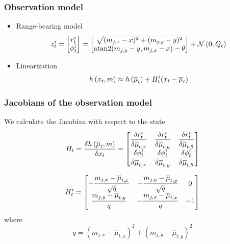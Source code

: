 \begin{frame}
    \frametitle{Observation model}
    \begin{itemize}
    \item Range-bearing model
    \begin{equation*}
    z_{t}^{i} =
    \begin{bmatrix}
    r_{t}^{i}\\
    \phi_{t}^{i}
    \end{bmatrix} =
    \begin{bmatrix}
    \sqrt{(m_{j,x}-x)^{2} + (m_{j,y}-y)^{2}}\\
    \operatorname{atan2}(m_{j,y}-y, m_{j,x}-x) -\theta
    \end{bmatrix}
    + \mathcal{N}\left( {0}, {Q_{t}} \right)
    \end{equation*}

    \item Linearization
    \begin{equation*}
    h\left( x_{t}, m \right) \approx h\left( \overline{\mu}_{t} \right) + H_{t}^{i}(x_{t}-\overline{\mu}_{t})
    \end{equation*}
    \end{itemize}

\end{frame}
    
\begin{frame}
    \frametitle{Jacobians of the observation model}
    We calculate the Jacobian with respect to the state
    \begin{equation*}
    H_{t} = \dfrac{\delta h\left( \overline{\mu}_{t},m \right)}{\delta x_{t}} =
    \begin{bmatrix}
    \dfrac{\delta r_{t}^{i}}{\delta \overline{\mu}_{t,x}} & \dfrac{\delta r_{t}^{i}}{\delta \overline{\mu}_{t,y}} & \dfrac{\delta r_{t}^{i}}{\delta \overline{\mu}_{t,\theta}}\\
    \dfrac{\delta \phi _{t}^{i}}{\delta \overline{\mu}_{t,x}} & \dfrac{\delta \phi _{t}^{i}}{\delta \overline{\mu}_{t,y}} & \dfrac{\delta \phi _{t}^{i}}{\delta \overline{\mu}_{t,\theta}}
    \end{bmatrix}
    \end{equation*}

    \begin{equation*}
    H_{t}^{i} =
    \begin{bmatrix}
    -\dfrac{m_{j,x} - \overline{\mu}_{t,x}}{\sqrt{q}} & -\dfrac{m_{j,y} - \overline{\mu}_{t,y}}{\sqrt{q}} & 0\\
    \dfrac{m_{j,y} - \overline{\mu}_{t,y}}{q} & -\dfrac{m_{j,x} - \overline{\mu}_{t,x}}{q} & -1
    \end{bmatrix}
    \end{equation*}
    where
    \begin{equation*}
    q = (m_{j,x}-\overline{\mu}_{t,x})^{2} + (m_{j,y}-\overline{\mu}_{t,y})^{2}
    \end{equation*}
\end{frame}

